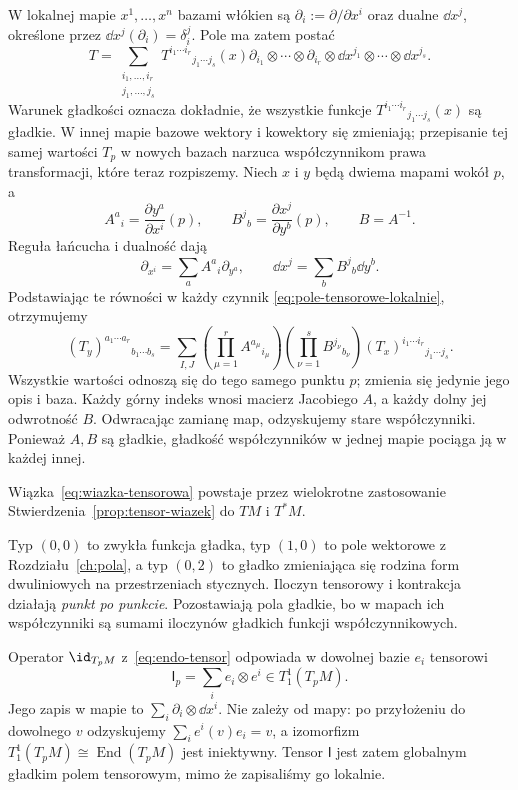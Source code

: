 W lokalnej mapie $x^1,\ldots,x^n$ bazami włókien są
$\partial_i:=\partial/\partial x^i$ oraz dualne
$\dd x^j$, określone przez $\dd x^j(\partial_i)=\delta_i^j$.
Pole ma zatem postać
\begin{equation}\label{eq:pole-tensorowe-lokalnie}
 T=\sum_{\substack{i_1,\ldots,i_r\\j_1,\ldots,j_s}}
 T^{i_1\cdots i_r}{}_{j_1\cdots j_s}(x)
 \partial_{i_1}\otimes\cdots\otimes\partial_{i_r}
 \otimes\dd x^{j_1}\otimes\cdots\otimes\dd x^{j_s}.
\end{equation}
Warunek gładkości oznacza dokładnie, że wszystkie funkcje
$T^{i_1\cdots i_r}{}_{j_1\cdots j_s}(x)$ są gładkie.
W innej mapie bazowe wektory i kowektory się zmieniają;
przepisanie tej samej wartości $T_p$ w nowych bazach
narzuca współczynnikom prawa transformacji, które teraz rozpiszemy.
Niech $x$ i $y$ będą dwiema mapami wokół $p$, a
\[
 A^a{}_i=\frac{\partial y^a}{\partial x^i}(p),\qquad
 B^j{}_b=\frac{\partial x^j}{\partial y^b}(p),\qquad B=A^{-1}.
\]
Reguła łańcucha i dualność dają
\[
 \partial_{x^i}=\sum_a A^a{}_i\partial_{y^a},\qquad
 \dd x^j=\sum_b B^j{}_b\dd y^b.
\]
Podstawiając te równości w każdy czynnik
\eqref{eq:pole-tensorowe-lokalnie}, otrzymujemy
\begin{equation}\label{eq:tensor-zmiana-wspolrzednych}
 (T_y)^{a_1\cdots a_r}{}_{b_1\cdots b_s}
 =\sum_{I,J}
 \left(\prod_{\mu=1}^r A^{a_\mu}{}_{i_\mu}\right)
 \left(\prod_{\nu=1}^s B^{j_\nu}{}_{b_\nu}\right)
 (T_x)^{i_1\cdots i_r}{}_{j_1\cdots j_s}.
\end{equation}
Wszystkie wartości odnoszą się do tego samego punktu $p$;
zmienia się jedynie jego opis i baza. Każdy górny indeks wnosi
macierz Jacobiego $A$, a każdy dolny jej odwrotność $B$.
Odwracając zamianę map, odzyskujemy stare współczynniki.
Ponieważ $A,B$ są gładkie, gładkość współczynników w jednej
mapie pociąga ją w każdej innej.

Wiązka~\eqref{eq:wiazka-tensorowa} powstaje
przez wielokrotne zastosowanie
Stwierdzenia~\ref{prop:tensor-wiazek} do $TM$ i $T^*M$.

Typ $(0,0)$ to zwykła funkcja gładka, typ $(1,0)$ to
pole wektorowe z Rozdziału~\ref{ch:pola}, a typ $(0,2)$
to gładko zmieniająca się rodzina form dwuliniowych
na przestrzeniach stycznych. Iloczyn tensorowy i kontrakcja
działają \emph{punkt po punkcie}. Pozostawiają pola gładkie,
bo w mapach ich współczynniki są sumami iloczynów
gładkich funkcji współczynnikowych.

\begin{przyklad}
Operator $\id_{T_pM}$ z~\eqref{eq:endo-tensor} odpowiada
w dowolnej bazie $e_i$ tensorowi
\[
 \mathsf I_p=\sum_i e_i\otimes e^i\in T^1_1(T_pM).
\]
Jego zapis w mapie to $\sum_i\partial_i\otimes\dd x^i$.
Nie zależy od mapy: po przyłożeniu do dowolnego $v$
odzyskujemy $\sum_i e^i(v)e_i=v$, a izomorfizm
$T^1_1(T_pM)\cong\operatorname{End}(T_pM)$ jest
iniektywny. Tensor $\mathsf I$ jest zatem globalnym
gładkim polem tensorowym, mimo że zapisaliśmy go lokalnie.
\end{przyklad}

